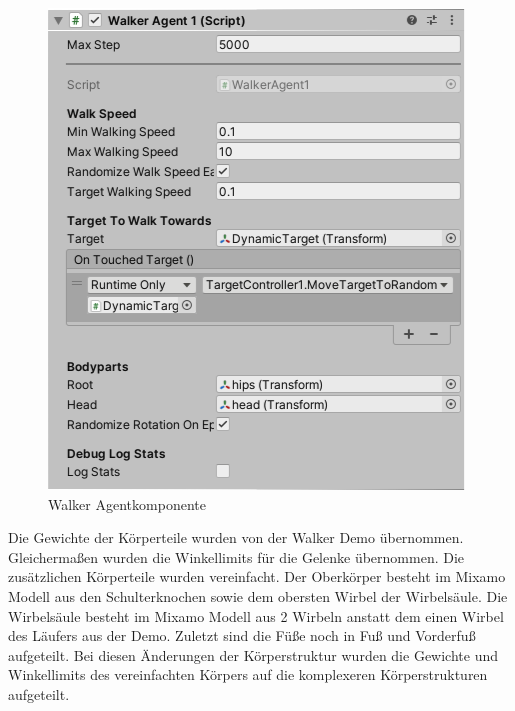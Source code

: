 \begin{figure}[H]
  \centering  
  \includegraphics[scale=0.5]{img/komponente_agent_walker1}
  \caption{Walker Agentkomponente}
  \label{fig:komponente_agent_walker1}
\end{figure}

Die Gewichte der Körperteile wurden von der Walker Demo übernommen. Gleichermaßen wurden die Winkellimits für die Gelenke übernommen. Die zusätzlichen Körperteile wurden vereinfacht. Der Oberkörper besteht im Mixamo Modell aus den Schulterknochen sowie dem obersten Wirbel der Wirbelsäule. Die Wirbelsäule besteht im Mixamo Modell aus 2 Wirbeln anstatt dem einen Wirbel des Läufers aus der Demo. Zuletzt sind die Füße noch in Fuß und Vorderfuß aufgeteilt. Bei diesen Änderungen der Körperstruktur wurden die Gewichte und Winkellimits des vereinfachten Körpers auf die komplexeren Körperstrukturen aufgeteilt.

